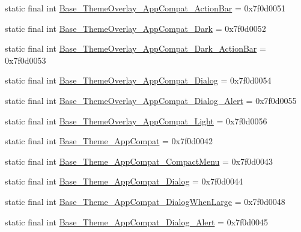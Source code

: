 \begin{DoxyCompactItemize}
\item 
static final int \mbox{\hyperlink{classandroid_1_1support_1_1design_1_1R_1_1style_a49d2551281a2c988061aae003f74c3f9}{Base\+\_\+\+Theme\+Overlay\+\_\+\+App\+Compat\+\_\+\+Action\+Bar}} = 0x7f0d0051
\item 
static final int \mbox{\hyperlink{classandroid_1_1support_1_1design_1_1R_1_1style_afb4e6370b2f51731f72ec339323a5457}{Base\+\_\+\+Theme\+Overlay\+\_\+\+App\+Compat\+\_\+\+Dark}} = 0x7f0d0052
\item 
static final int \mbox{\hyperlink{classandroid_1_1support_1_1design_1_1R_1_1style_a1981c4bc88e3e9762aee9a2a5644ce44}{Base\+\_\+\+Theme\+Overlay\+\_\+\+App\+Compat\+\_\+\+Dark\+\_\+\+Action\+Bar}} = 0x7f0d0053
\item 
static final int \mbox{\hyperlink{classandroid_1_1support_1_1design_1_1R_1_1style_a52662dc6ef309cb237e2d2965c0ca1e2}{Base\+\_\+\+Theme\+Overlay\+\_\+\+App\+Compat\+\_\+\+Dialog}} = 0x7f0d0054
\item 
static final int \mbox{\hyperlink{classandroid_1_1support_1_1design_1_1R_1_1style_a1b11d2332368be4301995110f2cbe7fd}{Base\+\_\+\+Theme\+Overlay\+\_\+\+App\+Compat\+\_\+\+Dialog\+\_\+\+Alert}} = 0x7f0d0055
\item 
static final int \mbox{\hyperlink{classandroid_1_1support_1_1design_1_1R_1_1style_a78157e543905b00fcad717119cee6e6b}{Base\+\_\+\+Theme\+Overlay\+\_\+\+App\+Compat\+\_\+\+Light}} = 0x7f0d0056
\item 
static final int \mbox{\hyperlink{classandroid_1_1support_1_1design_1_1R_1_1style_a0ecc8c4b192cb936ce1a2d29da08d931}{Base\+\_\+\+Theme\+\_\+\+App\+Compat}} = 0x7f0d0042
\item 
static final int \mbox{\hyperlink{classandroid_1_1support_1_1design_1_1R_1_1style_a5e099ee9a441023f84d082b6ea016c0c}{Base\+\_\+\+Theme\+\_\+\+App\+Compat\+\_\+\+Compact\+Menu}} = 0x7f0d0043
\item 
static final int \mbox{\hyperlink{classandroid_1_1support_1_1design_1_1R_1_1style_adb73b5d52d821420c1e34cfaabb62587}{Base\+\_\+\+Theme\+\_\+\+App\+Compat\+\_\+\+Dialog}} = 0x7f0d0044
\item 
static final int \mbox{\hyperlink{classandroid_1_1support_1_1design_1_1R_1_1style_a13ba16ca33b97a860d5376eb50a4a4cf}{Base\+\_\+\+Theme\+\_\+\+App\+Compat\+\_\+\+Dialog\+When\+Large}} = 0x7f0d0048
\item 
static final int \mbox{\hyperlink{classandroid_1_1support_1_1design_1_1R_1_1style_a050729902da0b8b24cc910dd938eef5d}{Base\+\_\+\+Theme\+\_\+\+App\+Compat\+\_\+\+Dialog\+\_\+\+Alert}} = 0x7f0d0045

\end{DoxyCompactItemize}
